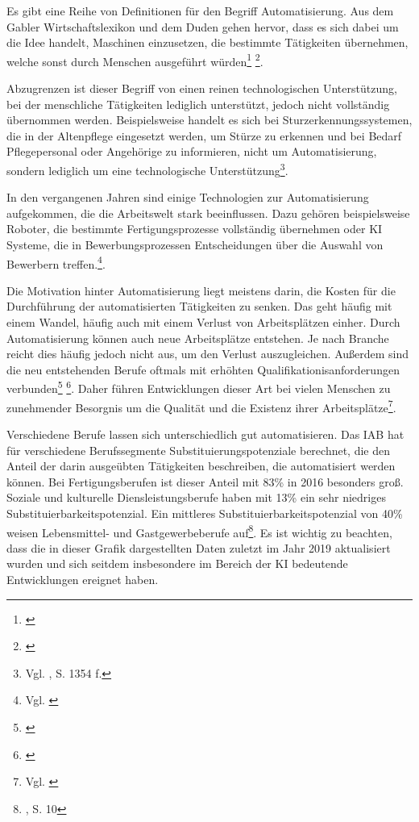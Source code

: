 Es gibt eine Reihe von Definitionen für den Begriff Automatisierung. Aus dem Gabler Wirtschaftslexikon und dem Duden gehen hervor, dass es sich dabei um die Idee handelt, Maschinen einzusetzen, die bestimmte Tätigkeiten übernehmen, welche sonst durch Menschen ausgeführt würden\footnote{\cite{Dudenredaktion.2023}} \footnote{\cite{.2019}}.

Abzugrenzen ist dieser Begriff von einen reinen technologischen Unterstützung, bei der menschliche Tätigkeiten lediglich unterstützt, jedoch nicht vollständig übernommen werden. Beispielsweise handelt es sich bei Sturzerkennungssystemen, die in der Altenpflege eingesetzt werden, um Stürze zu erkennen und bei Bedarf Pflegepersonal oder Angehörige zu informieren, nicht um Automatisierung, sondern lediglich um eine technologische Unterstützung\footnote{Vgl. \cite{Ganyo.2011}, S. 1354 f.}.


In den vergangenen Jahren sind einige Technologien zur Automatisierung aufgekommen, die die Arbeitswelt stark beeinflussen. Dazu gehören beispielsweise Roboter, die bestimmte Fertigungsprozesse vollständig übernehmen oder KI Systeme, die in Bewerbungsprozessen Entscheidungen über die Auswahl von Bewerbern treffen.\footnote{Vgl. \cite{DagnyDukach.2022}}.


Die Motivation hinter Automatisierung liegt meistens darin, die Kosten für die Durchführung der automatisierten Tätigkeiten zu senken. Das geht häufig mit einem Wandel, häufig auch mit einem Verlust von Arbeitsplätzen einher. Durch Automatisierung können auch neue Arbeitsplätze entstehen. Je nach Branche reicht dies häufig jedoch nicht aus, um den Verlust auszugleichen. Außerdem sind die neu entstehenden Berufe oftmals mit erhöhten Qualifikationisanforderungen verbunden\footnote{\cite{DagnyDukach.2022}} \footnote{\cite{Dengler.2019}}. Daher führen Entwicklungen dieser Art bei vielen Menschen zu zunehmender Besorgnis um die Qualität und die Existenz ihrer Arbeitsplätze\footnote{Vgl. \cite{AaronSmith.2017}}. 

Verschiedene Berufe lassen sich unterschiedlich gut automatisieren. Das IAB hat für verschiedene Berufssegmente Substituierungspotenziale berechnet, die den Anteil der darin ausgeübten Tätigkeiten beschreiben, die automatisiert werden können. Bei Fertigungsberufen ist dieser Anteil mit 83\% in 2016 besonders groß. Soziale und kulturelle Diensleistungsberufe haben mit 13\% ein sehr niedriges Substituierbarkeitspotenzial. Ein mittleres Substituierbarkeitspotenzial von 40\% weisen Lebensmittel- und Gastgewerbeberufe auf\footnote{\cite{Dengler.2019}, S. 10}. Es ist wichtig zu beachten, dass die in dieser Grafik dargestellten Daten zuletzt im Jahr 2019 aktualisiert wurden und sich seitdem insbesondere im Bereich der KI bedeutende Entwicklungen ereignet haben.

